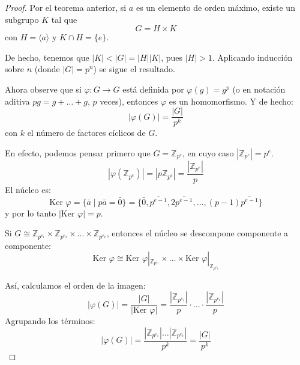 \begin{proof}
Por el teorema anterior, si $a$ es un elemento de orden máximo, existe un subgrupo $K$ tal que
\begin{equation*}
G = H \times K
\end{equation*}
con $H = \langle a \rangle$ y $K \cap H = \{e\}$.

De hecho, tenemos que $|K| < |G| = |H||K|$, pues $|H| > 1$.
Aplicando inducción sobre $n$ (donde $|G|=p^n$) se sigue el resultado.

Ahora observe que si $\varphi: G \to G$ está definida por $\varphi(g) = g^p$ (o en notación aditiva $pg = g + \dots + g$, $p$ veces), entonces $\varphi$ es un homomorfismo.
Y de hecho:
\begin{equation*}
|\varphi(G)| = \frac{|G|}{p^k}
\end{equation*}
con $k$ el número de factores cíclicos de $G$.

En efecto, podemos pensar primero que $G = \mathbb{Z}_{p^e}$, en cuyo caso $|\mathbb{Z}_{p^e}| = p^e$.
\begin{equation*}
|\varphi(\mathbb{Z}_{p^e})| = |p\mathbb{Z}_{p^e}| = \frac{|\mathbb{Z}_{p^e}|}{p}
\end{equation*}
El núcleo es:
\begin{equation*}
\text{Ker } \varphi = \{\bar{a} \mid p\bar{a} = \bar{0}\} = \{\bar{0}, \overline{p^{e-1}}, 2\overline{p^{e-1}}, \dots, (p-1)\overline{p^{e-1}}\}
\end{equation*}
y por lo tanto $|\text{Ker } \varphi| = p$.

Si $G \cong \mathbb{Z}_{p^{e_1}} \times \mathbb{Z}_{p^{e_2}} \times \dots \times \mathbb{Z}_{p^{e_k}}$,
entonces el núcleo se descompone componente a componente:
\begin{equation*}
\text{Ker } \varphi \cong \text{Ker } \varphi|_{\mathbb{Z}_{p^{e_1}}} \times \dots \times \text{Ker } \varphi|_{\mathbb{Z}_{p^{e_k}}}
\end{equation*}

Así, calculamos el orden de la imagen:
\begin{equation*}
|\varphi(G)| = \frac{|G|}{|\text{Ker } \varphi|} = \frac{|\mathbb{Z}_{p^{e_1}}|}{p} \cdot \dots \cdot \frac{|\mathbb{Z}_{p^{e_k}}|}{p}
\end{equation*}
Agrupando los términos:
\begin{equation*}
|\varphi(G)| = \frac{|\mathbb{Z}_{p^{e_1}}| \dots |\mathbb{Z}_{p^{e_k}}|}{p^k} = \frac{|G|}{p^k}
\end{equation*}


\end{proof}
